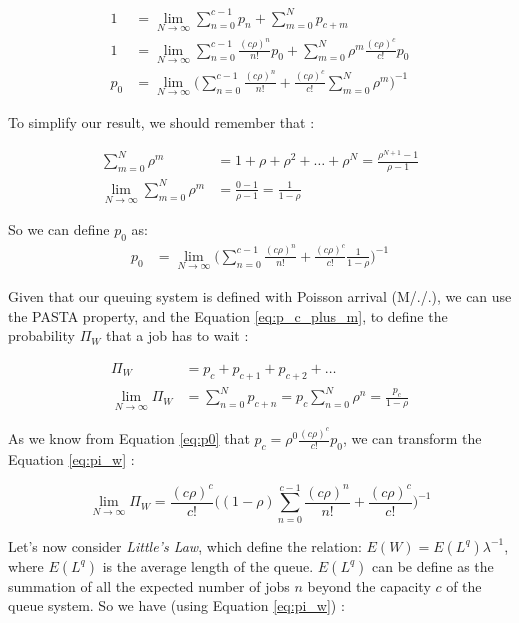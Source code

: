 \documentclass{article}
\begin{document}
    \begin{align}
        1 &= \lim_{N\to\infty} \sum_{n=0}^{c - 1} p_n + \sum_{m=0}^{N} p_{c + m} \\
        1 &= \lim_{N\to\infty} \sum_{n=0}^{c - 1} \frac{(c \rho)^n}{n!} p_0 + \sum_{m=0}^{N} \rho^m \frac{(c \rho)^c}{c !} p_0  \\
        p_0 &= \lim_{N\to\infty} \Big( \sum_{n=0}^{c - 1} \frac{(c \rho)^n}{n!} + \frac{(c \rho)^c}{c !} \sum_{m=0}^{N} \rho^m \Big)^{-1}
    \end{align}

    To simplify our result, we should remember that :

    \begin{align}
        \sum_{m=0}^{N} \rho^m &= 1 + \rho + \rho^2 + \ldots + \rho^N = \frac{\rho^{N + 1} - 1}{\rho - 1} \\
        \lim_{N\to\infty} \sum_{m=0}^{N} \rho^m &= \frac{0 - 1}{\rho - 1} = \frac{1}{1 - \rho}
    \end{align}

    So we can define $p_0$ as:
    \begin{align}
        p_0 &= \lim_{N\to\infty} \Big( \sum_{n=0}^{c - 1} \frac{(c \rho)^n}{n!} + \frac{(c \rho)^c}{c !} \frac{1}{1 - \rho} \Big)^{-1}
        \label{eq:p0}
    \end{align}

    Given that our queuing system is defined with Poisson arrival (M/./.), we can use the PASTA property, and the Equation \ref{eq:p_c_plus_m}, to define the probability $\Pi_W$ that a job has to wait :

    \begin{align}
        \Pi_W &= p_c + p_{c+1} + p_{c+2} + \ldots \\
        \lim_{N\to\infty} \Pi_W &= \sum_{n=0}^{N} p_{c + n} = p_c \sum_{n=0}^{N} \rho^n = \frac{p_c}{1 - \rho}
        \label{eq:pi_w}
    \end{align}

    As we know from Equation \ref{eq:p0} that $p_c = \rho^0 \frac{(c \rho)^c}{c!}p_0$, we can transform the Equation \ref{eq:pi_w} :

    \begin{equation}
        \lim_{N\to\infty} \Pi_W = \frac{(c \rho)^c}{c !} \Big((1 - \rho) \sum_{n = 0}^{c-1}\frac{(c \rho)^n}{n !} + \frac{(c \rho)^c}{c !} \Big)^{-1}
    \end{equation}

    Let's now consider \emph{Little's Law}, which define the relation: $E(W) = E(L^q) \lambda^{-1}$, where $E(L^q)$ is the average length of the queue.
    $E(L^q)$ can be define as the summation of all the expected number of jobs $n$ beyond the capacity $c$ of the queue system. So we have (using Equation \ref{eq:pi_w}) :
\end{document}
